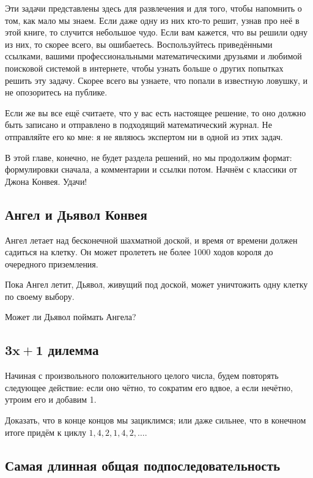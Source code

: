 Эти задачи представлены здесь для развлечения и для того, чтобы напомнить о том, как мало мы знаем.
Если даже одну из них кто-то решит, узнав про неё в этой книге, то случится небольшое чудо.
Если вам кажется, что вы решили одну из них, то скорее всего, вы ошибаетесь.
Воспользуйтесь приведёнными ссылками, вашими профессиональными математическими друзьями и любимой поисковой системой в интернете, чтобы узнать больше о других попытках решить эту задачу.
Скорее всего вы узнаете, что попали в известную ловушку, и не опозоритесь на публике.

Если же вы все ещё считаете, что у вас есть настоящее решение, то оно должно быть записано и отправлено в подходящий математический журнал.
Не отправляйте его ко мне: я не являюсь экспертом ни в одной из этих задач.

\medskip

В этой главе, конечно, не будет раздела решений, но мы продолжим формат: формулировки сначала, а комментарии и ссылки потом.
Начнём с классики от Джона Конвея.
Удачи!


\subsection*{Ангел и Дьявол Конвея}

Ангел летает над бесконечной шахматной доской, и время от времени должен садиться на клетку.
Он может пролететь не более 1000 ходов короля до очередного приземления.

Пока Ангел летит, Дьявол, живущий под доской, может уничтожить одну клетку по своему выбору.

Может ли Дьявол поймать Ангела?

\subsection*{$\bm{3x+1}$ дилемма}

Начиная с произвольного положительного целого числа, будем повторять следующее действие: если оно чётно, то сократим его вдвое, а если нечётно, утроим его и добавим 1.

Доказать, что в конце концов мы зациклимся; или даже сильнее, что в конечном итоге придём к циклу $1, 4, 2, 1, 4, 2,\dots$.

\subsection*{Самая длинная общая подпоследовательность}

